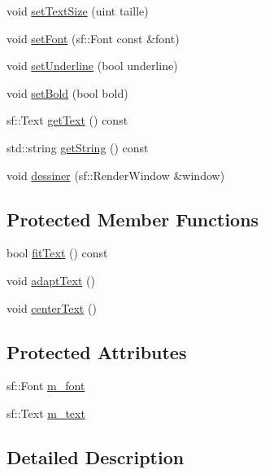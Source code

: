 \begin{DoxyCompactItemize}
\item 
void \hyperlink{classBoutonTexte_a6f61089ff0ac3781d7e8ee6b71abbd01}{set\+Text\+Size} (uint taille)
\item 
void \hyperlink{classBoutonTexte_aa1be3dfb869765c3fb3af4d44d0736ed}{set\+Font} (sf\+::\+Font const \&font)
\item 
void \hyperlink{classBoutonTexte_a6b1db5ebeca2a12e5525770ed5636687}{set\+Underline} (bool underline)
\item 
void \hyperlink{classBoutonTexte_afcaf8ea6421d4ded5cee30739553c17e}{set\+Bold} (bool bold)
\item 
sf\+::\+Text \hyperlink{classBoutonTexte_a426af0b13653bc55cb4652ce4d1fe985}{get\+Text} () const
\item 
std\+::string \hyperlink{classBoutonTexte_a621710e92704902ac505a89a9d1ef67b}{get\+String} () const
\item 
void \hyperlink{classBoutonTexte_a144df8e92d58470bc15b87dd13b6c3ef}{dessiner} (sf\+::\+Render\+Window \&window)
\end{DoxyCompactItemize}
\subsection*{Protected Member Functions}
\begin{DoxyCompactItemize}
\item 
bool \hyperlink{classBoutonTexte_a8f5bb56ad2161d1d204ee73af9d68eb8}{fit\+Text} () const
\item 
void \hyperlink{classBoutonTexte_a54ca85310f69ccc120df980495390466}{adapt\+Text} ()
\item 
void \hyperlink{classBoutonTexte_a3b9eef3a26d8925c558582a7216c8e3c}{center\+Text} ()
\end{DoxyCompactItemize}
\subsection*{Protected Attributes}
\begin{DoxyCompactItemize}
\item 
sf\+::\+Font \hyperlink{classBoutonTexte_a92d3ce11bc4a1719d86458bad2f05849}{m\+\_\+font}
\item 
sf\+::\+Text \hyperlink{classBoutonTexte_a96c677df7e44162cc9206e84fe2692cf}{m\+\_\+text}
\end{DoxyCompactItemize}


\subsection{Detailed Description}


